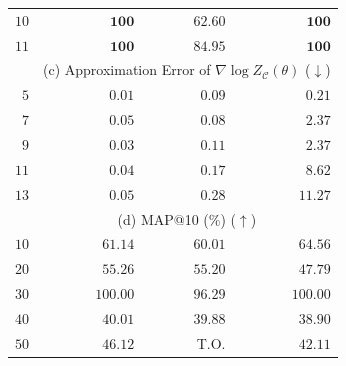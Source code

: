 \begin{table}[!t]
\begin{tabular}{r|rrr}
        $10$    & $\mathbf{100}$                                                                                       & $62.60$  & $\mathbf{100}$    \\ %
        $11$    & $\mathbf{100}$                                                                                       & $84.95$  & $\mathbf{100}$    \\ %
        \hline
                & \multicolumn{3}{c}{(c) Approximation Error of  $\nabla\log Z_{\mathcal{C}}(\theta)$  ($\downarrow$)}                                \\ \hline
        $5$     & $\mathbf{0.01}$                                                                                      & $0.09$   & $0.21$            \\
        $7$     & $\mathbf{0.05}$                                                                                      & $0.08$   & $2.37$            \\
        $9$     & $\mathbf{0.03}$                                                                                      & $0.11$   & $2.37$            \\
        $11$    & $\mathbf{0.04}$                                                                                      & $0.17$   & $8.62$            \\
        $13$    & $\mathbf{0.05}$                                                                                      & $0.28$   & $11.27$           \\
        \hline
                & \multicolumn{3}{c}{(d) MAP@10 (\%) ($\uparrow$) }                                                                                   \\ \hline
        $10$    & $61.14$                                                                                              & $60.01$  & $\mathbf{64.56}$  \\
        $20$    & $\mathbf{55.26}$                                                                                     & $55.20$  & $47.79$           \\
        $30$    & $\mathbf{100.00}$                                                                                    & $96.29$  & $\mathbf{100.00}$ \\
        $40$    & $\mathbf{40.01}$                                                                                     & $39.88$  & $38.90$           \\
        $50$    & $\mathbf{46.12}$                                                                                     & T.O.     & $42.11$           \\
        \hline
    \end{tabular}
\end{table}

